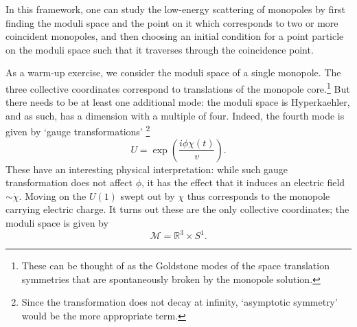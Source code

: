 \documentclass[aps, prd, twocolumn, superscriptaddress, preprintnumbers, nofootinbib, longbibliography]{revtex4-1}
\begin{document}
 In this framework, one can study the low-energy scattering of monopoles by first finding the moduli space and the point on it which corresponds to two or more coincident monopoles, and then choosing an initial condition for a point particle on the moduli space such that it traverses through the coincidence point. 

As a warm-up exercise, we consider the moduli space of a single monopole. The three collective coordinates correspond to translations of the monopole core.\footnote{These can be thought of as the Goldstone modes of the space translation symmetries that are spontaneously broken by the monopole solution.}
But there needs to be at least one additional mode: the moduli space is Hyperkaehler, and as such, has a dimension with a multiple of four. Indeed, the fourth mode is given by `gauge transformations' \footnote{Since the transformation does not decay at infinity, `asymptotic symmetry' would be the more appropriate term.}
\begin{equation}\label{eq: electric charge transformation}
    U = \exp \left( \frac{i \phi \chi(t)}{v} \right). 
\end{equation}
These have an interesting physical interpretation: while such gauge transformation does not affect $\phi$, it has the effect that it induces an electric field $\sim \dot{\chi}$. Moving on the $U(1)$ swept out by $\chi$ thus corresponds to the monopole carrying electric charge. It turns out these are the only collective coordinates; the moduli space is given by
\begin{equation}
    \mathcal{M}= \mathbb{R}^3 \times S^1. 
\end{equation}
\end{document}
